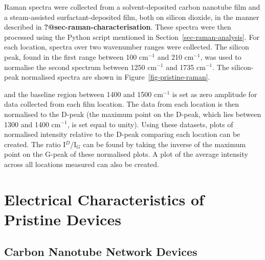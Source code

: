 \documentclass[
  a4paper,
]{scrbook}
\begin{document}
Raman spectra were collected from a solvent-deposited carbon nanotube
film and a steam-assisted surfactant-deposited film, both on silicon
dioxide, in the manner described in
\textbf{?@sec-raman-characterisation}. These spectra were then processed
using the Python script mentioned in Section~\ref{sec-raman-analysis}.
For each location, spectra over two wavenumber ranges were collected.
The silicon peak, found in the first range between 100 cm\(^{-1}\) and
210 cm\(^{-1}\), was used to normalise the second spectrum between 1250
cm\(^{-1}\) and 1735 cm\(^{-1}\). The silicon-peak normalised spectra
are shown in Figure~\ref{fig-pristine-raman}.

and the baseline region between 1400 and 1500 cm\(^{-1}\) is set as zero
amplitude for data collected from each film location. The data from each
location is then normalised to the D-peak (the maximum point on the
D-peak, which lies between 1300 and 1400 cm\(^{-1}\), is set equal to
unity). Using these datasets, plots of normalised intensity relative to
the D-peak comparing each location can be created. The ratio
I\(^{D}\)/I\(_{G}\) can be found by taking the inverse of the maximum
point on the G-peak of these normalised plots. A plot of the average
intensity across all locations measured can also be created.

\hypertarget{sec-pristine-electrical-characterisation}{%
\section{Electrical Characteristics of Pristine
Devices}\label{sec-pristine-electrical-characterisation}}

\hypertarget{carbon-nanotube-network-devices}{%
\subsection{Carbon Nanotube Network
Devices}\label{carbon-nanotube-network-devices}}
\end{document}
